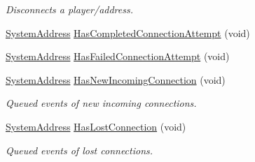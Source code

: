 \begin{DoxyCompactItemize}
\begin{DoxyCompactList}\small\item\em Disconnects a player/address. \end{DoxyCompactList}\item 
\hyperlink{struct_rak_net_1_1_system_address}{System\-Address} \hyperlink{class_rak_net_1_1_packetized_t_c_p_a6f4ea26d9594c10576d14d29f9a65bb3}{Has\-Completed\-Connection\-Attempt} (void)
\item 
\hyperlink{struct_rak_net_1_1_system_address}{System\-Address} \hyperlink{class_rak_net_1_1_packetized_t_c_p_ad75f0d7ee28e1b6f345e82e8923d51c1}{Has\-Failed\-Connection\-Attempt} (void)
\item 
\hypertarget{class_rak_net_1_1_packetized_t_c_p_af6f8280b14542a622660bedb1460dac1}{\hyperlink{struct_rak_net_1_1_system_address}{System\-Address} \hyperlink{class_rak_net_1_1_packetized_t_c_p_af6f8280b14542a622660bedb1460dac1}{Has\-New\-Incoming\-Connection} (void)}\label{class_rak_net_1_1_packetized_t_c_p_af6f8280b14542a622660bedb1460dac1}

\begin{DoxyCompactList}\small\item\em Queued events of new incoming connections. \end{DoxyCompactList}\item 
\hypertarget{class_rak_net_1_1_packetized_t_c_p_aa59539c92158061dd2548957203f197e}{\hyperlink{struct_rak_net_1_1_system_address}{System\-Address} \hyperlink{class_rak_net_1_1_packetized_t_c_p_aa59539c92158061dd2548957203f197e}{Has\-Lost\-Connection} (void)}\label{class_rak_net_1_1_packetized_t_c_p_aa59539c92158061dd2548957203f197e}

\begin{DoxyCompactList}\small\item\em Queued events of lost connections. \end{DoxyCompactList}\end{DoxyCompactItemize}
